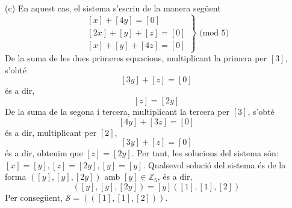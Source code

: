 \begin{solucio}
(c) En aquest cas, el sistema s’escriu de la manera següent%
\begin{equation*}
\left.
\begin{array}{r}
\left[ x\right] +\left[ 4y\right] =\left[ 0\right] \\
\left[ 2x\right] +\left[ y\right] +\left[ z\right] =\left[ 0\right] \\
\left[ x\right] +\left[ y\right] +\left[ 4z\right] =\left[ 0\right]%
\end{array}%
\right\} \text{ (mod }5\text{)}
\end{equation*}%
De la suma de les dues primeres equacions, multiplicant la primera per $%
\left[ 3\right] $, s’obté%
\begin{equation*}
\left[ 3y\right] +\left[ z\right] =\left[ 0\right]
\end{equation*}%
és a dir,%
\begin{equation*}
\left[ z\right] =\left[ 2y\right]
\end{equation*}%
De la suma de la segona i tercera, multiplicant la tercera per $\left[ 3%
\right] $, s’obté%
\begin{equation*}
\left[ 4y\right] +\left[ 3z\right] =\left[ 0\right]
\end{equation*}%
és a dir, multiplicant per $\left[ 2\right] $,
\begin{equation*}
\left[ 3y\right] +\left[ z\right] =\left[ 0\right]
\end{equation*}%
és a dir, obtenim que $\left[ z\right] =\left[ 2y\right] $. Per tant, les
solucions del sistema són:$\left[ x\right] =\left[ y\right] ,\left[ z\right]
=\left[ 2y\right] ,\left[ y\right] =\left[ y\right] $. Qualsevol solució del sistema és de la forma $(\left[ y\right] ,\left[ y\right] ,\left[ 2y%
\right] )$ amb $\left[ y\right] \in \mathbb{Z}_{5}$, és a dir,%
\begin{equation*}
(\left[ y\right] ,\left[ y\right] ,\left[ 2y\right] )=\left[ y\right] \left( %
\left[ 1\right] ,\left[ 1\right] ,\left[ 2\right] \right)
\end{equation*}%
Per consegüent, $\mathcal{S}=\left( \left( \left[ 1\right] ,\left[ 1\right]
,\left[ 2\right] \right) \right) $.
\end{solucio}

